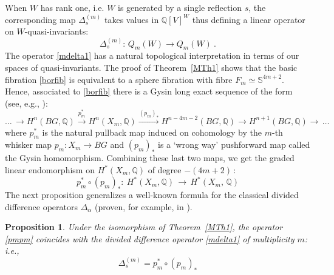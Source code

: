 \documentclass[11pt]{amsart}
\newtheorem{prop}[theorem]{Proposition}
\theoremstyle{definition}
\theoremstyle{remark}
\numberwithin{equation}{section}
\newcommand{\la}{\label}
\def\bS{\mathbb S}
\def\Q{\mathbb{Q}}
\begin{document}
When $W$ has rank one, i.e. $W$ is generated by a single reflection $s $, the corresponding map $ \Delta_s^{(m)} $ takes values in $ \Q[V]^W $ thus defining a linear operator on $W$-quasi-invariants:
%
\begin{equation}
\la{mdelta1}
\Delta^{(m)}_s:\, Q_m(W) \to Q_m(W)\ . 
\end{equation}
%
The operator \eqref{mdelta1} has a natural topological interpretation in terms of our spaces of quasi-invariants. The proof of Theorem~\ref{MTh1} shows that the basic fibration
\eqref{borfib} is equivalent to a sphere fibration with fibre $ F_m \simeq \bS^{4m+2} $. Hence,
associated to \eqref{borfib} there is a Gysin long exact sequence of the form 
(see, e.g., \cite[Example~II.5.C]{McL01}):
%
\begin{equation}
\la{Gysin}
\ldots \,\to H^n(BG, \Q) \xrightarrow{p_m^*} H^n(X_m, \Q) \xrightarrow{(p_m)_*} H^{n-4m-2}(BG, \Q) \to H^{n+1}(BG, \Q) \to\, \ldots 
\end{equation}
%
where $ p_m^*$ is the natural pullback map induced on cohomology by the $m$-th whisker map
$p_m: X_m \to BG $ and $ (p_m)_* $ is a `wrong way' pushforward map called the Gysin homomorphism.
Combining these last two maps, we get the graded linear endomorphism on $ H^*(X_m, \Q)$ of  degree $ - (4m +2) \,$:
%
\begin{equation}
\la{pmpm}
p_m^* \circ (p_m)_*:\ H^*(X_m, \Q)\,\to \, H^*(X_m,\,\Q)
\end{equation}
%
The next proposition generalizes a well-known formula for the classical divided difference operators $ \Delta_{\alpha} $ (proven, for example, in \cite{BE90}).
%
\begin{prop}
\la{P22}
Under the isomorphism of Theorem~\ref{MTh1}, the operator \eqref{pmpm} coincides with the
divided difference operator \eqref{mdelta1} of multiplicity $m$: i.e.,
%
\begin{equation}
\la{dpmpm}
\Delta_s^{(m)} = p_m^* \circ (p_m)_*
\end{equation}
\end{prop}
%
\end{document}
